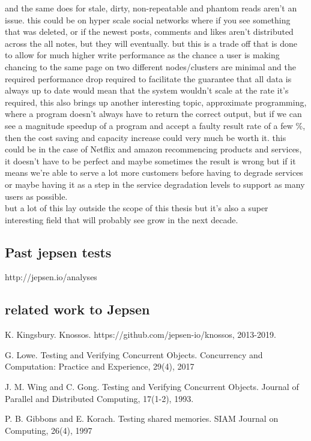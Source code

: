\documentclass[
  a4paper,  %
  twoside,  %
  bibliography=totoc,
  headsepline,
  cleardoublepage=empty,
  parskip=half,
  draft=false
]{scrbook}
\begin{document}
and the same does for stale, dirty, non-repeatable and phantom reads aren't an issue. this could be on hyper scale social networks where if you see something that was deleted, or if the newest posts, comments and likes aren't distributed across the all notes, but they will eventually. but this is a trade off that is done to allow for much higher write performance as the chance a user is making chancing to the same page on two different nodes/clusters are minimal and the required performance drop required to facilitate the guarantee that all data is always up to date would mean that the system wouldn't scale at the rate it's required, this also brings up another interesting topic, approximate programming, where a program doesn't always have to return the correct output, but if we can see a magnitude speedup of a program and accept a faulty result rate of a few \%, then the cost saving and capacity increase could very much be worth it. this could be in the case of Netflix and amazon recommencing products and services, it doesn't have to be perfect and maybe sometimes the result is wrong but if it means we're able to serve a lot more customers before having to degrade services or maybe having it as a step in the service degradation levels to support as many users as possible. \\

but a lot of this lay outside the scope of this thesis but it's also a super interesting field that will probably see grow in the next decade.



\subsection{Past jepsen tests}

http://jepsen.io/analyses


\subsection{related work to Jepsen}


K. Kingsbury. Knossos.
https://github.com/jepsen-io/knossos, 2013-2019.

G. Lowe. Testing and Verifying Concurrent Objects.
Concurrency and Computation: Practice and
Experience, 29(4), 2017

J. M. Wing and C. Gong. Testing and Verifying
Concurrent Objects. Journal of Parallel and
Distributed Computing, 17(1-2), 1993.

P. B. Gibbons and E. Korach. Testing shared
memories. SIAM Journal on Computing, 26(4), 1997
\end{document}
